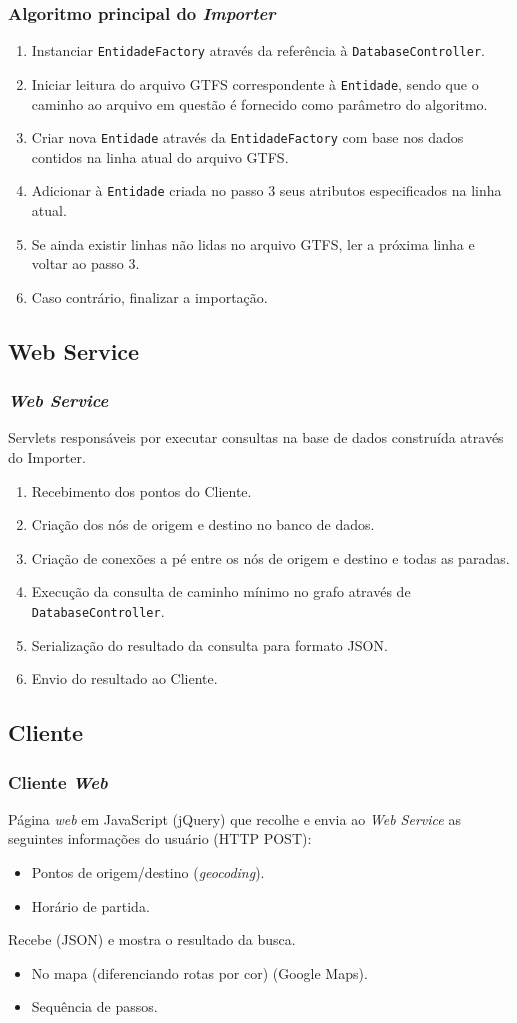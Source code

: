 \frame
{
\frametitle{Algoritmo principal do \emph{Importer}}
\begin{enumerate}
	\item Instanciar \texttt{EntidadeFactory} através da referência à \texttt{DatabaseController}.
	\item Iniciar leitura do arquivo GTFS correspondente à \texttt{Entidade}, sendo que o caminho ao arquivo em questão é fornecido como parâmetro do algoritmo.
	\item Criar nova \texttt{Entidade} através da \texttt{EntidadeFactory} com base nos dados contidos na linha atual do arquivo GTFS.
	\item Adicionar à \texttt{Entidade} criada no passo 3 seus atributos especificados na linha atual.
	\item Se ainda existir linhas não lidas no arquivo GTFS, ler a próxima linha e voltar ao passo 3.
	\item Caso contrário, finalizar a importação.
\end{enumerate}
}

\subsection{Web Service}
\frame
{
\frametitle{\emph{Web Service}}
Servlets responsáveis por executar consultas na base de dados construída através do Importer.

\begin{enumerate}
\item Recebimento dos pontos do Cliente.
\item Criação dos nós de origem e destino no banco de dados.
\item Criação de conexões a pé entre os nós de origem e destino e todas as paradas.
\item Execução da consulta de caminho mínimo no grafo através de \texttt{DatabaseController}.
\item Serialização do resultado da consulta para formato JSON.
\item Envio do resultado ao Cliente.
\end{enumerate}
}

\subsection{Cliente}
\frame
{
\frametitle{Cliente \emph{Web}}
Página \emph{web} em JavaScript (jQuery) que recolhe e envia ao \emph{Web Service} as seguintes informações do usuário (HTTP POST):
\begin{itemize}
\item Pontos de origem/destino (\emph{geocoding}).
\item Horário de partida.
\end{itemize}
Recebe (JSON) e mostra o resultado da busca.
\begin{itemize}
\item No mapa (diferenciando rotas por cor) (Google Maps).
\item Sequência de passos.
\end{itemize}
}

